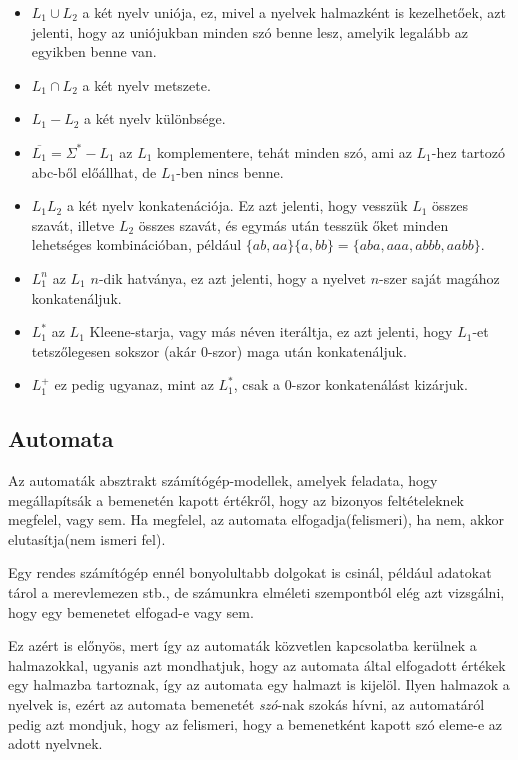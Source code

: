 \documentclass[12pt]{report}
\theoremstyle{definition}
\begin{document}
\begin{itemize}
\item $L_1 \cup L_2$ a két nyelv uniója, ez, mivel a nyelvek halmazként is kezelhetőek, azt jelenti, hogy az uniójukban minden szó benne lesz, amelyik legalább az egyikben benne van.
\item $L_1 \cap L_2$ a két nyelv metszete.
\item $L_1 - L_2$ a két nyelv különbsége.
\item $\overline{L_1} = \Sigma^* - L_1$ az $L_1$ komplementere, tehát minden szó, ami az $L_1$-hez tartozó abc-ből előállhat, de $L_1$-ben nincs benne.
\item $L_1L_2$ a két nyelv konkatenációja. Ez azt jelenti, hogy vesszük $L_1$ összes szavát, illetve $L_2$ összes szavát, és egymás után tesszük őket minden lehetséges kombinációban, például $\{ab,aa\}\{a,bb\} = \{aba,aaa,abbb,aabb\}$.
\item $L_1^n$ az $L_1$ $n$-dik hatványa, ez azt jelenti, hogy a nyelvet $n$-szer saját magához konkatenáljuk.
\item $L_1^*$ az $L_1$ Kleene-starja, vagy más néven iteráltja, ez azt jelenti, hogy $L_1$-et tetszőlegesen sokszor (akár 0-szor) maga után konkatenáljuk.
\item $L_1^+$ ez pedig ugyanaz, mint az $L_1^*$, csak a 0-szor konkatenálást kizárjuk.
\end{itemize}

\subsection{Automata}
Az automaták absztrakt számítógép-modellek, amelyek feladata, hogy megállapítsák a bemenetén kapott értékről, hogy az bizonyos feltételeknek megfelel, vagy sem. Ha megfelel, az automata elfogadja(felismeri), ha nem, akkor elutasítja(nem ismeri fel).

Egy rendes számítógép ennél bonyolultabb dolgokat is csinál, például adatokat tárol a merevlemezen stb., de számunkra elméleti szempontból elég azt vizsgálni, hogy egy bemenetet elfogad-e vagy sem.

Ez azért is előnyös, mert így az automaták közvetlen kapcsolatba kerülnek a halmazokkal, ugyanis azt mondhatjuk, hogy az automata által elfogadott értékek egy halmazba tartoznak, így az automata egy halmazt is kijelöl. Ilyen halmazok a nyelvek is, ezért az automata bemenetét \textit{szó}-nak szokás hívni, az automatáról pedig azt mondjuk, hogy az felismeri, hogy a bemenetként kapott szó eleme-e az adott nyelvnek.
\end{document}
